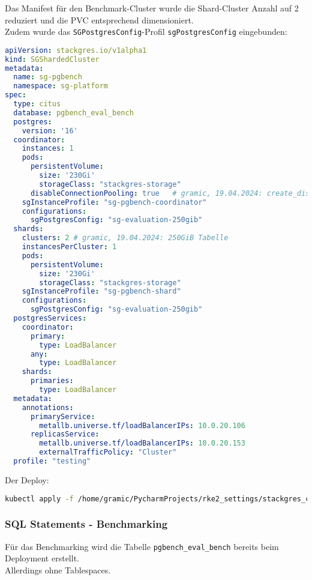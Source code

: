 Das Manifest für den Benchmark-Cluster wurde die Shard-Cluster Anzahl auf 2 reduziert und die PVC entsprechend dimensioniert.\\
Zudem wurde das \texttt{SGPostgresConfig}-Profil \texttt{sgPostgresConfig} eingebunden:
\lstset{style=gra_codestyle}
\begin{lstlisting}[language=yaml, caption=StackGres-Citus - Benchmarking - SGShardedCluster 250GiB,captionpos=b,label={lst:SGShardedCluster_pgbench.yaml-250gib},breaklines=true]
apiVersion: stackgres.io/v1alpha1
kind: SGShardedCluster
metadata:
  name: sg-pgbench
  namespace: sg-platform
spec:
  type: citus
  database: pgbench_eval_bench
  postgres:
    version: '16'
  coordinator:
    instances: 1
    pods:
      persistentVolume:
        size: '230Gi'
        storageClass: "stackgres-storage"
      disableConnectionPooling: true   # gramic, 19.04.2024: create_distributed_table auf pgbench_accounts lässt sich nicht ausführen wegen pgbouncer problemen
    sgInstanceProfile: "sg-pgbench-coordinator"
    configurations:
      sgPostgresConfig: "sg-evaluation-250gib"
  shards:
    clusters: 2 # gramic, 19.04.2024: 250GiB Tabelle
    instancesPerCluster: 1
    pods:
      persistentVolume:
        size: '230Gi'
        storageClass: "stackgres-storage"
    sgInstanceProfile: "sg-pgbench-shard"
    configurations:
      sgPostgresConfig: "sg-evaluation-250gib"
  postgresServices:
    coordinator:
      primary:
        type: LoadBalancer
      any:
        type: LoadBalancer
    shards:
      primaries:
        type: LoadBalancer
  metadata:
    annotations:
      primaryService:
        metallb.universe.tf/loadBalancerIPs: 10.0.20.106
      replicasService:
        metallb.universe.tf/loadBalancerIPs: 10.0.20.153
        externalTrafficPolicy: "Cluster"
  profile: "testing"
\end{lstlisting}

Der Deploy:
\lstset{style=gra_codestyle}
\begin{lstlisting}[language=bash, caption=StackGres-Citus - Benchmark - Cluster Deploy 250GiB,captionpos=b,label={lst:stackgres_citus-benchmnarking-deploy-cluster-250gib},breaklines=true]
kubectl apply -f /home/gramic/PycharmProjects/rke2_settings/stackgres_citus/stackgres_citus/SGShardedCluster_pgbench.yaml
\end{lstlisting}

\subsubsection{SQL Statements - Benchmarking}
\label{subsubsec:stackgres_citus_benchmarking_sql}
Für das Benchmarking wird die Tabelle \texttt{pgbench\_eval\_bench} bereits beim Deployment erstellt.\\
Allerdings ohne Tablespaces.

